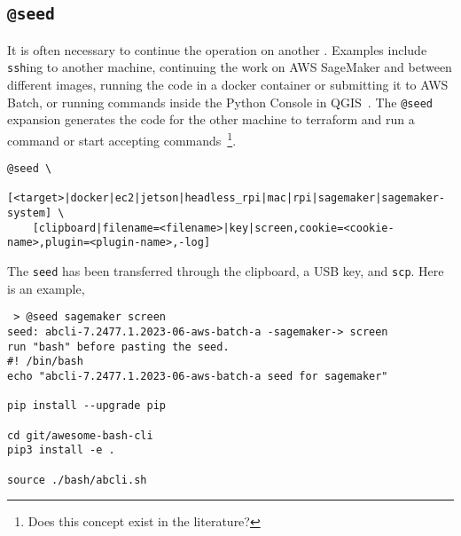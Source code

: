 \subsection{\texttt{@seed}}
\label{seed}

It is often necessary to continue the operation on another . Examples include \texttt{ssh}ing to another machine, continuing the work on AWS SageMaker and between different images, running the code in a docker container or submitting it to AWS Batch, or running commands inside the Python Console in QGIS~. The \texttt{@seed} expansion generates the code for the other machine to terraform and run a command or start accepting commands~\footnote{Does this concept exist in the literature?}.
%
\begin{verbatim}
@seed \
    [<target>|docker|ec2|jetson|headless_rpi|mac|rpi|sagemaker|sagemaker-system] \
    [clipboard|filename=<filename>|key|screen,cookie=<cookie-name>,plugin=<plugin-name>,-log]
\end{verbatim}
%
The \texttt{seed} has been transferred through the clipboard, a USB key, and \texttt{scp}. Here is an example,
%
\begin{verbatim}
 > @seed sagemaker screen
seed: abcli-7.2477.1.2023-06-aws-batch-a -sagemaker-> screen
run "bash" before pasting the seed.
#! /bin/bash
echo "abcli-7.2477.1.2023-06-aws-batch-a seed for sagemaker"

pip install --upgrade pip

cd git/awesome-bash-cli
pip3 install -e .

source ./bash/abcli.sh
\end{verbatim}